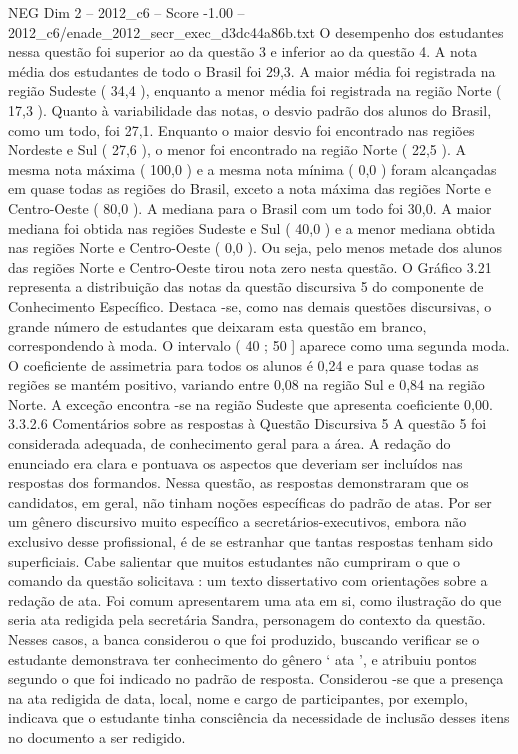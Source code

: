 \begin{textsample}{NEG Dim 2 – 2012\_c6 – Score -1.00 – 2012\_c6/enade\_2012\_secr\_exec\_d3dc44a86b.txt}
O desempenho dos estudantes nessa questão foi superior ao da questão 3 e inferior ao da questão 4.
A nota média dos estudantes de todo o Brasil foi 29,3.
A maior média foi registrada na região Sudeste ( 34,4 ), enquanto a menor média foi registrada na região Norte ( 17,3 ).
Quanto à variabilidade das notas, o desvio padrão dos alunos do Brasil, como um todo, foi 27,1.
Enquanto o maior desvio foi encontrado nas regiões Nordeste e Sul ( 27,6 ), o menor foi encontrado na região Norte ( 22,5 ).
A mesma nota máxima ( 100,0 ) e a mesma nota mínima ( 0,0 ) foram alcançadas em quase todas as regiões do Brasil, exceto a nota máxima das regiões Norte e Centro-Oeste ( 80,0 ).
A mediana para o Brasil com um todo foi 30,0.
A maior mediana foi obtida nas regiões Sudeste e Sul ( 40,0 ) e a menor mediana obtida nas regiões Norte e Centro-Oeste ( 0,0 ).
Ou seja, pelo menos metade dos alunos das regiões Norte e Centro-Oeste tirou nota zero nesta questão.
O Gráfico 3.21 representa a distribuição das notas da questão discursiva 5 do componente de Conhecimento Específico.
Destaca -se, como nas demais questões discursivas, o grande número de estudantes que deixaram esta questão em branco, correspondendo à moda.
O intervalo ( 40 ; 50 ] aparece como uma segunda moda.
O coeficiente de assimetria para todos os alunos é 0,24 e para quase todas as regiões se mantém positivo, variando entre 0,08 na região Sul e 0,84 na região Norte.
A exceção encontra -se na região Sudeste que apresenta coeficiente 0,00. 3.3.2.6 Comentários sobre as respostas à Questão Discursiva 5 A questão 5 foi considerada adequada, de conhecimento geral para a área.
A redação do enunciado era clara e pontuava os aspectos que deveriam ser incluídos nas respostas dos formandos.
Nessa questão, as respostas demonstraram que os candidatos, em geral, não tinham noções específicas do padrão de atas.
Por ser um gênero discursivo muito específico a secretários-executivos, embora não exclusivo desse profissional, é de se estranhar que tantas respostas tenham sido superficiais.
Cabe salientar que muitos estudantes não cumpriram o que o comando da questão solicitava : um texto dissertativo com orientações sobre a redação de ata.
Foi comum apresentarem uma ata em si, como ilustração do que seria ata redigida pela secretária Sandra, personagem do contexto da questão.
Nesses casos, a banca considerou o que foi produzido, buscando verificar se o estudante demonstrava ter conhecimento do gênero ‘ ata ’, e atribuiu pontos segundo o que foi indicado no padrão de resposta.
Considerou -se que a presença na ata redigida de data, local, nome e cargo de participantes, por exemplo, indicava que o estudante tinha consciência da necessidade de inclusão desses itens no documento a ser redigido.

\end{textsample}
